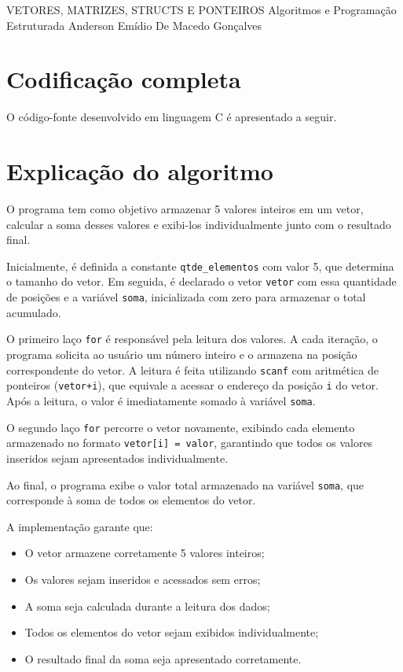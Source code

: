 \documentclass[12pt,a4paper]{article}
\begin{document}
\montarinicio
    {VETORES, MATRIZES, STRUCTS E PONTEIROS}
    {Algoritmos e Programação Estruturada}
    {Anderson Emídio De Macedo Gonçalves}

\section{Codificação completa}

O código-fonte desenvolvido em linguagem C é apresentado a seguir.

\lstset{language=C}



\newpage

\section{Explicação do algoritmo}

O programa tem como objetivo armazenar 5 valores inteiros em um vetor, calcular a soma desses valores e exibi-los individualmente junto com o resultado final.

Inicialmente, é definida a constante \texttt{qtde\_elementos} com valor 5, que determina o tamanho do vetor. Em seguida, é declarado o vetor \texttt{vetor} com essa quantidade de posições e a variável \texttt{soma}, inicializada com zero para armazenar o total acumulado.

O primeiro laço \texttt{for} é responsável pela leitura dos valores. A cada iteração, o programa solicita ao usuário um número inteiro e o armazena na posição correspondente do vetor. A leitura é feita utilizando \texttt{scanf} com aritmética de ponteiros (\texttt{vetor+i}), que equivale a acessar o endereço da posição \texttt{i} do vetor. Após a leitura, o valor é imediatamente somado à variável \texttt{soma}.

O segundo laço \texttt{for} percorre o vetor novamente, exibindo cada elemento armazenado no formato \texttt{vetor[i] = valor}, garantindo que todos os valores inseridos sejam apresentados individualmente.

Ao final, o programa exibe o valor total armazenado na variável \texttt{soma}, que corresponde à soma de todos os elementos do vetor.

A implementação garante que:
\begin{itemize}
    \item O vetor armazene corretamente 5 valores inteiros;
    \item Os valores sejam inseridos e acessados sem erros;
    \item A soma seja calculada durante a leitura dos dados;
    \item Todos os elementos do vetor sejam exibidos individualmente;
    \item O resultado final da soma seja apresentado corretamente.
\end{itemize}
\end{document}
